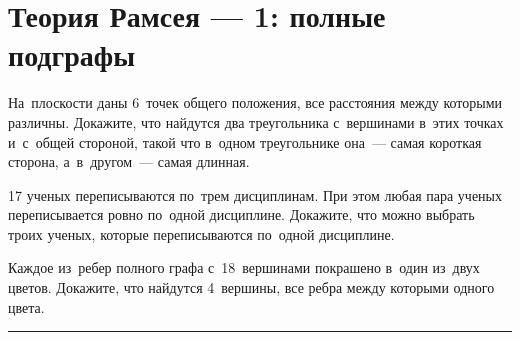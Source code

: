 
\section*{Теория Рамсея --- 1: полные подграфы}


\begin{problems}

На~плоскости даны 6~точек общего положения, все расстояния между которыми
различны.
Докажите, что найдутся два треугольника с~вершинами в~этих точках и~с~общей
стороной, такой что в~одном треугольнике она~--- самая короткая сторона,
а~в~другом~--- самая длинная.

17 ученых переписываются по~трем дисциплинам.
При этом любая пара ученых переписывается ровно по~одной дисциплине.
Докажите, что можно выбрать троих ученых, которые переписываются по~одной
дисциплине.


Каждое из~ребер полного графа с~18~вершинами покрашено в~один из~двух цветов.
Докажите, что найдутся 4~вершины, все ребра между которыми одного цвета.

\end{problems}

\medskip
\hrule

